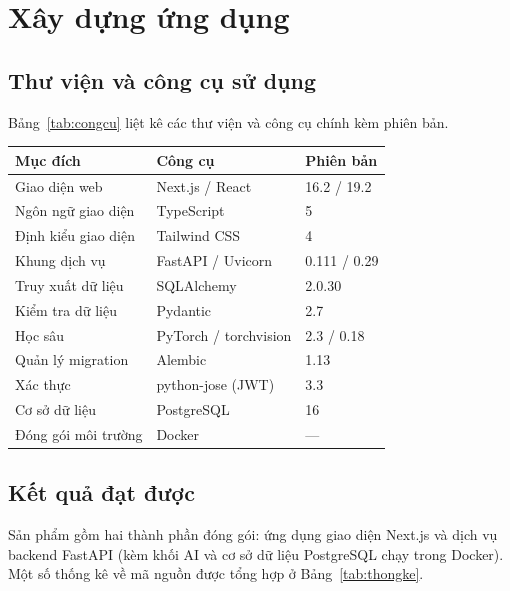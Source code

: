 \documentclass[../DoAn.tex]{subfiles}
\begin{document}

\section{Xây dựng ứng dụng}
\label{sec:4-xaydung}

\subsection{Thư viện và công cụ sử dụng}
Bảng~\ref{tab:congcu} liệt kê các thư viện và công cụ chính kèm phiên bản.

\begin{center}
\label{tab:congcu}
\begin{tabular}{|p{4.3cm}|p{4.2cm}|p{4.3cm}|}\hline
\textbf{Mục đích} & \textbf{Công cụ} & \textbf{Phiên bản} \\ \hline
Giao diện web & Next.js / React & 16.2 / 19.2 \\ \hline
Ngôn ngữ giao diện & TypeScript & 5 \\ \hline
Định kiểu giao diện & Tailwind CSS & 4 \\ \hline
Khung dịch vụ & FastAPI / Uvicorn & 0.111 / 0.29 \\ \hline
Truy xuất dữ liệu & SQLAlchemy & 2.0.30 \\ \hline
Kiểm tra dữ liệu & Pydantic & 2.7 \\ \hline
Học sâu & PyTorch / torchvision & 2.3 / 0.18 \\ \hline
Quản lý migration & Alembic & 1.13 \\ \hline
Xác thực & python-jose (JWT) & 3.3 \\ \hline
Cơ sở dữ liệu & PostgreSQL & 16 \\ \hline
Đóng gói môi trường & Docker & --- \\ \hline
\end{tabular}
\end{center}

\subsection{Kết quả đạt được}
Sản phẩm gồm hai thành phần đóng gói: ứng dụng giao diện Next.js và dịch vụ backend FastAPI (kèm khối AI và cơ sở dữ liệu PostgreSQL chạy trong Docker). Một số thống kê về mã nguồn được tổng hợp ở Bảng~\ref{tab:thongke}.
\end{document}

